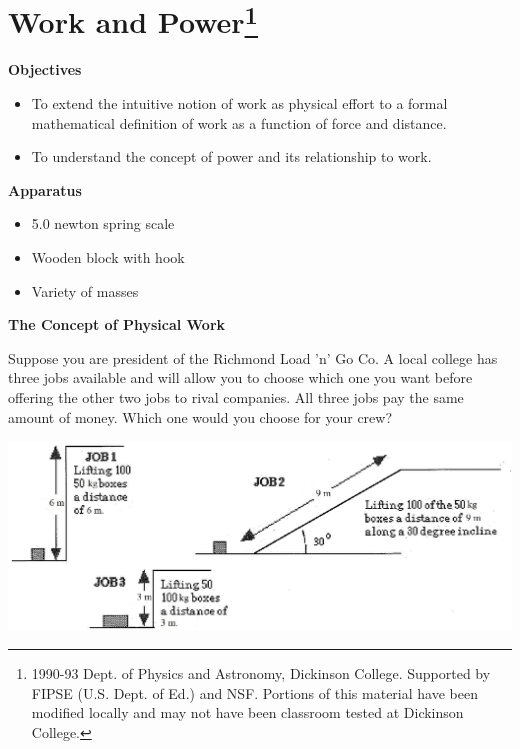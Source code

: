 
\section{Work and Power\footnote{
1990-93 Dept. of Physics and Astronomy, Dickinson College. Supported by FIPSE
(U.S. Dept. of Ed.) and NSF. Portions of this material have been modified locally
and may not have been classroom tested at Dickinson College.
}}

\makelabheader %

\textbf{Objectives }

\begin{itemize}
\item To extend the intuitive notion of work as physical effort to a formal mathematical
definition of work as a function of force and distance. 
\item To understand the concept of power and its relationship to work.
\end{itemize}
\textbf{Apparatus }

\begin{itemize}
\item 5.0 newton spring scale 
\item Wooden block with hook 
\item Variety of masses
\end{itemize}
\textbf{The Concept of Physical Work }

Suppose you are president of the Richmond Load 'n' Go Co. A local college has
three jobs available and will allow you to choose which one you want before
offering the other two jobs to rival companies. All three jobs pay the same
amount of money. Which one would you choose for your crew?

\vspace{0.3cm}
{\par\centering \includegraphics[width=6.2in,]{work_power/work_power_fig1s.eps} \par}
\vspace{0.3cm}

